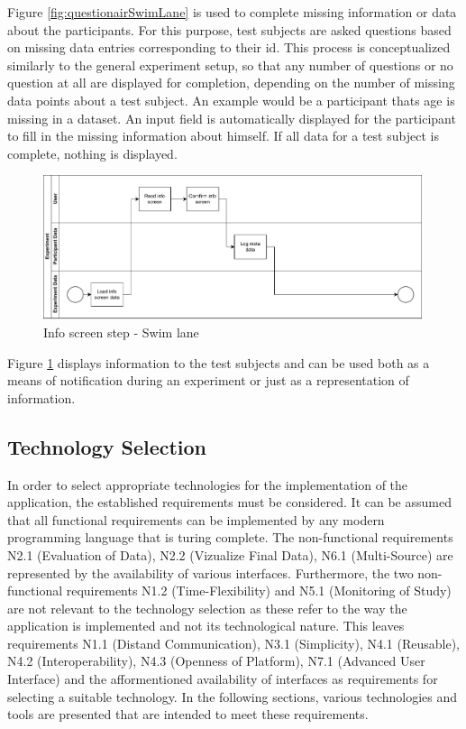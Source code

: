 Figure \ref{fig:questionairSwimLane} is used to complete missing information or data about the participants. For this purpose, test subjects are asked questions based on missing data entries corresponding to their \ac{id}. This process is conceptualized similarly to the general experiment setup, so that any number of questions or no question at all are displayed for completion, depending on the number of missing data points about a test subject. An example would be a participant thats age is missing in a dataset. An input field is automatically displayed for the participant to fill in the missing information about himself. If all data for a test subject is complete, nothing is displayed.

\begin{figure}[htbp]
    \centering
    \includegraphics[width=0.99\textwidth, keepaspectratio]{content/05_design_and_dev_artefacts/InfoScreenSwimLane.drawio.pdf}
    \caption{Info screen step - Swim lane}    
    \label{fig:infoScreenSwimLane}
\end{figure}

Figure \ref{fig:infoScreenSwimLane} displays information to the test subjects and can be used both as a means of notification during an experiment or just as a representation of information.

\subsection{Technology Selection}

In order to select appropriate technologies for the implementation of the application, the established requirements must be considered. It can be assumed that all functional requirements can be implemented by any modern programming language that is turing complete. The non-functional requirements N2.1 (Evaluation of Data), N2.2 (Vizualize Final Data), N6.1 (Multi-Source) are represented by the availability of various interfaces. Furthermore, the two non-functional requirements N1.2 (Time-Flexibility) and N5.1 (Monitoring of Study) are not relevant to the technology selection as these refer to the way the application is implemented and not its technological nature. This leaves requirements N1.1 (Distand Communication),  N3.1 (Simplicity), N4.1 (Reusable), N4.2 (Interoperability), N4.3 (Openness of Platform), N7.1 (Advanced User Interface) and the afformentioned availability of interfaces as requirements for selecting a suitable technology. In the following sections, various technologies and tools are presented that are intended to meet these requirements.

